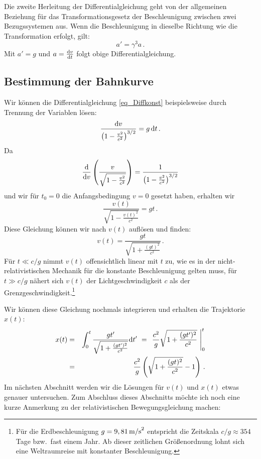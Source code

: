 Die zweite Herleitung der Differentialgleichung
geht von der allgemeinen Beziehung f\"ur das
Transformationsgesetz der Beschleunigung zwischen
zwei Bezugssystemen aus. Wenn die Beschleunigung
in dieselbe Richtung wie die Transformation erfolgt,
gilt:
\begin{equation}
        a' = \gamma^3 a  \, .
\end{equation} 
Mit $a'=g$ und $a=\frac{{\rm d}v}{{\rm d}t}$ folgt obige
Differentialgleichung.

\subsection{Bestimmung der Bahnkurve}
\label{sec_Konst}

Wir k\"onnen die Differentialgleichung \ref{eq_Diffkonst}
beispielsweise durch Trennung der Variablen
l\"osen:
\begin{equation}
     \frac{{\rm d}v}{\left( 1 - \frac{v^2}{c^2} \right)^{3/2}} = g\, {\rm d}t \, .
\end{equation}
Da
\begin{equation}
           \frac{\rm d}{{\rm d} v} \left( \frac{v}{\sqrt{1 - \frac{v^2}{c^2}}} \right)
           =      \frac{1}{\left( 1 - \frac{v^2}{c^2} \right)^{3/2}} 
\end{equation}
und wir f\"ur $t_0=0$ die Anfangsbedingung $v=0$ gesetzt
haben, erhalten wir
\begin{equation}
\label{eq_Diff2}
         \frac{v(t)}{\sqrt{1-\frac{v(t)^2}{c^2}}} = g t \, .
\end{equation}
Diese Gleichung k\"onnen wir nach $v(t)$ aufl\"osen und
finden:
\begin{equation}
\label{eq_relGesch}
          v(t) = \frac{gt}{\sqrt{1 + \frac{(gt)^2}{c^2}}}  \, .
\end{equation}
F\"ur $t \ll c/g$ nimmt $v(t)$ offensichtlich linear mit $t$
zu, wie es in der nicht-relativistischen Mechanik f\"ur
die konstante Beschleunigung gelten muss, f\"ur
$t \gg c/g$ n\"ahert sich $v(t)$ der Lichtgeschwindigkeit
$c$ als der Grenzgeschwindigkeit.\footnote{F\"ur die
Erdbeschleunigung $g=9,81\,{\rm m/s}^2$ entspricht
die Zeitskala $c/g\approx 354$ Tage bzw.\ fast einem Jahr.
Ab dieser zeitlichen Gr\"o\ss enordnung lohnt sich eine 
Weltraumreise mit konstanter Beschleunigung.}

Wir k\"onnen diese Gleichung nochmals integrieren
und erhalten die Trajektorie $x(t)$:
\begin{eqnarray}
     x(t) &=&  \int_0^t \frac{gt'}{\sqrt{1 + \frac{(gt')^2}{c^2}}} {\rm d}t' ~=~  
     \left. \frac{c^2}{g} \sqrt{1+\frac{(g t')^2}{c^2}} ~ \right|_0^t  \\
     &=&
\label{eq_konstBeschl}
     \frac{c^2}{g} \left( \sqrt{1+\frac{(gt)^2}{c^2}} -1 \right) \, .
\end{eqnarray}
Im n\"achsten Abschnitt werden wir die L\"osungen
f\"ur $v(t)$ und $x(t)$ etwas genauer untersuchen.
Zum Abschluss dieses Abschnitts m\"ochte ich
noch eine kurze Anmerkung zu der relativistischen
Bewegungsgleichung machen:

